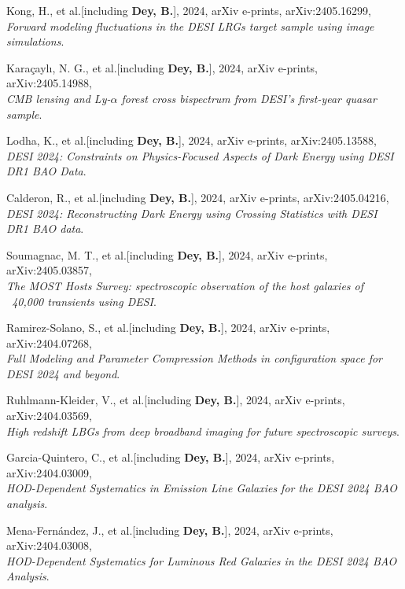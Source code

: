 \item Kong, H., et al.[including \textbf{Dey, B.}], 2024, arXiv e-prints, arXiv:2405.16299, \\ \textit{Forward modeling fluctuations in the DESI LRGs target sample using image simulations}. 
 

\item Karaçaylı, N. G., et al.[including \textbf{Dey, B.}], 2024, arXiv e-prints, arXiv:2405.14988, \\ \textit{CMB lensing and Ly-$\alpha$ forest cross bispectrum from DESI's first-year quasar sample}. 
 

\item Lodha, K., et al.[including \textbf{Dey, B.}], 2024, arXiv e-prints, arXiv:2405.13588, \\ \textit{DESI 2024: Constraints on Physics-Focused Aspects of Dark Energy using DESI DR1 BAO Data}. 
 

\item Calderon, R., et al.[including \textbf{Dey, B.}], 2024, arXiv e-prints, arXiv:2405.04216, \\ \textit{DESI 2024: Reconstructing Dark Energy using Crossing Statistics with DESI DR1 BAO data}. 
 

\item Soumagnac, M. T., et al.[including \textbf{Dey, B.}], 2024, arXiv e-prints, arXiv:2405.03857, \\ \textit{The MOST Hosts Survey: spectroscopic observation of the host galaxies of ~40,000 transients using DESI}. 
 

\item Ramirez-Solano, S., et al.[including \textbf{Dey, B.}], 2024, arXiv e-prints, arXiv:2404.07268, \\ \textit{Full Modeling and Parameter Compression Methods in configuration space for DESI 2024 and beyond}. 
 

\item Ruhlmann-Kleider, V., et al.[including \textbf{Dey, B.}], 2024, arXiv e-prints, arXiv:2404.03569, \\ \textit{High redshift LBGs from deep broadband imaging for future spectroscopic surveys}. 
 

\item Garcia-Quintero, C., et al.[including \textbf{Dey, B.}], 2024, arXiv e-prints, arXiv:2404.03009, \\ \textit{HOD-Dependent Systematics in Emission Line Galaxies for the DESI 2024 BAO analysis}. 
 

\item Mena-Fernández, J., et al.[including \textbf{Dey, B.}], 2024, arXiv e-prints, arXiv:2404.03008, \\ \textit{HOD-Dependent Systematics for Luminous Red Galaxies in the DESI 2024 BAO Analysis}. 
 


